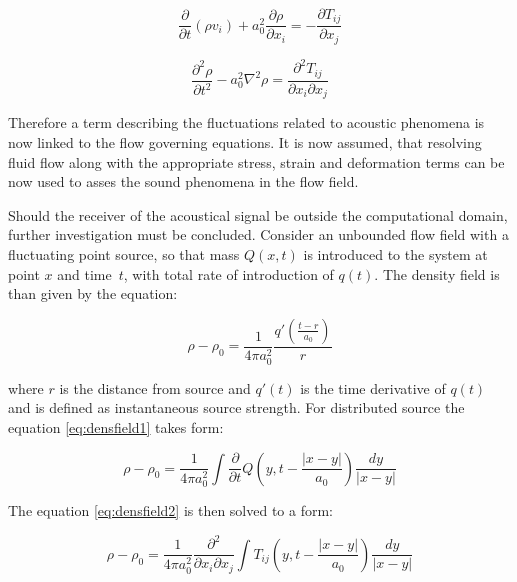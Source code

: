 \begin{equation} \label{eq:caacont5}
\frac{\partial}{\partial t} \left(\rho v_i \right) + a_0^2\frac{\partial \rho}{\partial x_i} = - \frac{\partial T_{ij}}{\partial x_j}
\end{equation}

\begin{equation} \label{eq:caacont6}
\frac{\partial^2 \rho}{\partial t^2} - a_0^2 \nabla^2 \rho = \frac{\partial^2 T_{ij}}{\partial x_i \partial x_j}
\end{equation}

Therefore a term describing the fluctuations related to acoustic phenomena is now linked to the flow governing equations. It is now assumed, that resolving fluid flow along with the appropriate stress, strain and deformation terms can be now used to asses the sound phenomena in the flow field.

Should the receiver of the acoustical signal be outside the computational domain, further investigation must be concluded. Consider an unbounded flow field with a fluctuating point source, so that mass $Q(x, t)$ is introduced to the system at point $x$ and time~$t$, with total rate of introduction of $q(t)$. The density field is than given by the equation:

\begin{equation} \label{eq:densfield1}
\rho - \rho_0 = \frac{1}{4 \pi a_0^2} \frac{q' \left( \frac{t-r}{a_0} \right)}{r}
\end{equation}

\noindent where $r$ is the distance from source and $q'(t)$ is the time derivative of $q(t)$ and is defined as instantaneous source strength. For distributed source the equation \ref{eq:densfield1} takes form:

\begin{equation} \label{eq:densfield2}
\rho - \rho_0 = \frac{1}{4 \pi a_0^2} \int \frac{\partial}{\partial t} Q \left(y, t - \frac{\lvert x-y \rvert}{a_0} \right) \frac{dy}{\lvert x-y \rvert}
\end{equation}

The equation \ref{eq:densfield2} is then solved to a form:

\begin{equation} \label{eq:denssolved}
\rho - \rho_0 = \frac{1}{4 \pi a_0^2} \frac{\partial^2}{\partial x_i \partial x_j}
\int T_{ij} \left(y, t - \frac{\lvert x-y \rvert}{a_0} \right) \frac{dy}{\lvert x-y \rvert}
\end{equation}

